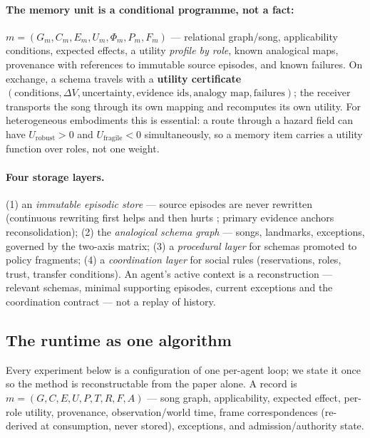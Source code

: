 \documentclass{article}
\begin{document}
\paragraph{The memory unit is a conditional programme, not a fact:}
$m = (G_m, C_m, E_m, U_m, \Phi_m, P_m, F_m)$ --- relational
graph/song, applicability conditions, expected effects, a utility
\emph{profile by role}, known analogical maps, provenance with
references to immutable source episodes, and known failures. On
exchange, a schema travels with a \textbf{utility certificate}
$(\text{conditions}, \Delta V, \text{uncertainty},
\text{evidence ids}, \text{analogy map}, \text{failures})$; the
receiver transports the song through its own mapping and recomputes
its own utility. For heterogeneous embodiments this is essential: a
route through a hazard field can have $U_{\mathrm{robust}} > 0$ and
$U_{\mathrm{fragile}} < 0$ simultaneously, so a memory item carries a
utility function over roles, not one weight.

\paragraph{Four storage layers.} (1) an \emph{immutable episodic
store} --- source episodes are never rewritten (continuous rewriting
first helps and then hurts \citep{faulty2026}; primary evidence
anchors reconsolidation); (2) the \emph{analogical schema graph} ---
songs, landmarks, exceptions, governed by the two-axis matrix; (3) a
\emph{procedural layer} for schemas promoted to policy fragments;
(4) a \emph{coordination layer} for social rules (reservations,
roles, trust, transfer conditions). An agent's active context is a
reconstruction --- relevant schemas, minimal supporting episodes,
current exceptions and the coordination contract --- not a replay of
history.

\subsection{The runtime as one algorithm}
\label{p5:sec:algorithm}

Every experiment below is a configuration of one per-agent loop; we
state it once so the method is reconstructable from the paper alone.
A record is $m=(G,C,E,U,P,T,R,F,A)$ --- song graph, applicability,
expected effect, per-role utility, provenance, observation/world
time, frame correspondences (re-derived at consumption, never
stored), exceptions, and admission/authority state.
\end{document}

